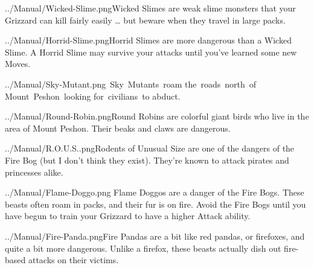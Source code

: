 \documentclass[10pt,twocolumn,openany,article]{memoir}
\begin{document}
{\raggedright
\vspace{14pt}

\lettrine[image=true,                lines=5,               findent=3pt,
nindent=3pt]{../Manual/Wicked-Slime.png}{}Wicked  Slimes are  weak slime
monsters that  your Grizzard can  kill fairly  easily … but  beware when
they travel in large packs.

\vspace{14pt}

\lettrine[image=true,                lines=5,               findent=3pt,
nindent=3pt]{../Manual/Horrid-Slime.png}{}Horrid   Slimes   are    more
dangerous than a  Wicked Slime. A Horrid Slime may  survive your attacks
until you've learned some new Moves.

\vspace{14pt}

\lettrine[image=true,                lines=5,               findent=3pt,
nindent=3pt]{../Manual/Sky-Mutant.png}{}~Sky~Mutants~roam
the~roads~north~of Mount~Peshon~looking for~civilians~to abduct.

\vspace{14pt}

\lettrine[image=true,                lines=5,               findent=3pt,
nindent=3pt]{../Manual/Round-Robin.png}{}Round Robins are colorful giant
birds who live  in the area of  Mount Peshon. Their beaks  and claws are
dangerous.

\ifdefined\ATARIAGESAVE\pagebreak\else
\vspace{14pt}
\fi

\lettrine[image=true,                lines=5,               findent=3pt,
nindent=3pt]{../Manual/R.O.U.S..png}{}Rodents of Unusual Size are one of
the  dangers  of   the  Fire  Bog  (but  I  don't   think  they  exist).
They're known to attack pirates and princesses alike.

\vspace{14pt}

\lettrine[image=true,                lines=5,               findent=3pt,
nindent=3pt]{../Manual/Flame-Doggo.png}{} Flame Doggos are a danger of
the Fire  Bogs. These beasts  often roam in packs,  and their fur  is on
fire. Avoid the Fire Bogs until you have begun to train your Grizzard to
have a higher Attack ability.

\vspace{14pt}

\lettrine[image=true,                lines=5,               findent=3pt,
nindent=3pt]{../Manual/Fire-Panda.png}{}Fire Pandas  are a bit  like red
pandas, or firefoxes, and quite a  bit more dangerous. Unlike a firefox,
these beasts actually dish out fire-based attacks on their victims.

}
\end{document}
